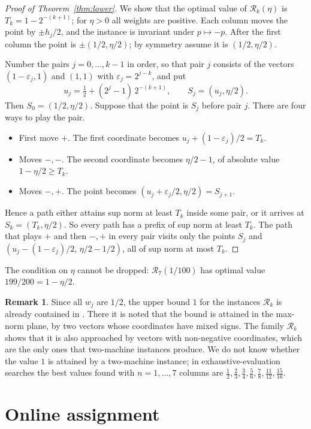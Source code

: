 \documentclass[11pt]{article}
\theoremstyle{definition}
\newtheorem{remark}[theorem]{Remark}
\newcommand{\eps}{\varepsilon}
\begin{document}
\begin{proof}[Proof of Theorem~\ref{thm:lower}]
We show that the optimal value of $\mathcal R_k(\eta)$ is
$T_k=1-2^{-(k+1)}$; for $\eta>0$ all weights are positive.  Each column
moves the point by $\pm h_j/2$, and the instance is invariant under
$p\mapsto-p$.  After the first column the point is $\pm(1/2,\eta/2)$; by
symmetry assume it is $(1/2,\eta/2)$.

Number the pairs $j=0,\dots,k-1$ in order, so that pair $j$ consists of
the vectors $(1-\eps_j,1)$ and $(1,1)$ with $\eps_j=2^{j-k}$, and put
\[
 u_j=\tfrac12+(2^j-1)\,2^{-(k+1)},\qquad S_j=(u_j,\eta/2).
\]
Then $S_0=(1/2,\eta/2)$.  Suppose that the point is $S_j$ before pair
$j$.  There are four ways to play the pair.
\begin{itemize}
\item First move $+$.  The first coordinate becomes
$u_j+(1-\eps_j)/2=T_k$.
\item Moves $-,-$.  The second coordinate becomes $\eta/2-1$, of absolute
value $1-\eta/2\ge T_k$.
\item Moves $-,+$.  The point becomes $(u_j+\eps_j/2,\eta/2)=S_{j+1}$.
\end{itemize}
Hence a path either attains sup norm at least $T_k$ inside some pair, or
it arrives at $S_k=(T_k,\eta/2)$.  So every path has a prefix of sup norm
at least $T_k$.  The path that plays $+$ and then $-,+$ in every pair
visits only the points $S_j$ and $(u_j-(1-\eps_j)/2,\,\eta/2-1/2)$, all of
sup norm at most $T_k$.
\end{proof}

The condition on $\eta$ cannot be dropped: $\mathcal R_7(1/100)$ has
optimal value $199/200=1-\eta/2$.

\begin{remark}
Since all $w_j$ are $1/2$, the upper bound $1$ for the instances
$\mathcal R_k$ is already contained in \citep{LundMagazinov2015}.  There
it is noted that the bound is attained in the max-norm plane, by two
vectors whose coordinates have mixed signs.  The family $\mathcal R_k$
shows that it is also approached by vectors with non-negative
coordinates, which are the only ones that two-machine instances produce.
We do not know whether the value $1$ is attained by a two-machine
instance; in exhaustive-evaluation searches the best values found with
$n=1,\dots,7$ columns are
$\tfrac12,\tfrac23,\tfrac34,\tfrac56,\tfrac78,\tfrac{11}{12},\tfrac{15}{16}$.
\end{remark}

\section{Online assignment}\label{sec:online}
\end{document}
